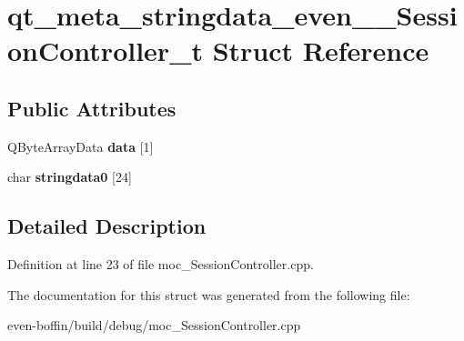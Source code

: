 \hypertarget{structqt__meta__stringdata__even_____session_controller__t}{}\section{qt\+\_\+meta\+\_\+stringdata\+\_\+even\+\_\+\+\_\+\+Session\+Controller\+\_\+t Struct Reference}
\label{structqt__meta__stringdata__even_____session_controller__t}
\subsection*{Public Attributes}
\begin{DoxyCompactItemize}
\item 
\mbox{\label{structqt__meta__stringdata__even_____session_controller__t_aa4f5cf4743efdfdb3b17f44719ebebc2}} 
Q\+Byte\+Array\+Data {\bfseries data} \mbox{[}1\mbox{]}
\item 
\mbox{\label{structqt__meta__stringdata__even_____session_controller__t_ab0ebd2bf9398938d1742b9cabb669e21}} 
char {\bfseries stringdata0} \mbox{[}24\mbox{]}
\end{DoxyCompactItemize}


\subsection{Detailed Description}


Definition at line 23 of file moc\+\_\+\+Session\+Controller.\+cpp.



The documentation for this struct was generated from the following file\+:\begin{DoxyCompactItemize}
\item 
even-\/boffin/build/debug/moc\+\_\+\+Session\+Controller.\+cpp\end{DoxyCompactItemize}
